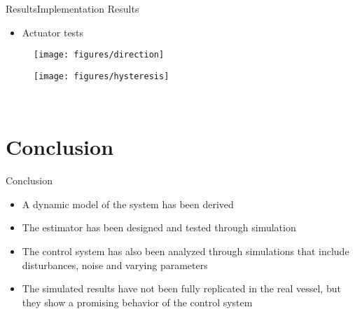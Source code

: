 \begin{frame}{Results}{Implementation Results}
    \begin{itemize}
        \item Actuator tests
    \end{itemize}
    \begin{minipage}{0.45\linewidth}
        \begin{figure}[H]
            \centering
            \texttt{[image: figures/direction]}
        \end{figure}       
    \end{minipage}\hfill      
    \begin{minipage}{0.45\linewidth}
        \begin{figure}[H]
            \centering
            \texttt{[image: figures/hysteresis]}
        \end{figure}             
    \end{minipage}\hfill \\    
\end{frame}

\section{Conclusion}

\begin{frame}{Conclusion}{}
    \begin{itemize}
        \item A dynamic model of the system has been derived
    \end{itemize}
    \begin{itemize}
        \item The estimator has been designed and tested through simulation
    \end{itemize}
    \begin{itemize}
        \item The control system has also been analyzed through simulations that include disturbances, noise and varying parameters
    \end{itemize}
    \begin{itemize}
        \item The simulated results have not been fully replicated in the real vessel, but they show a promising behavior of the control system
    \end{itemize}
\end{frame}